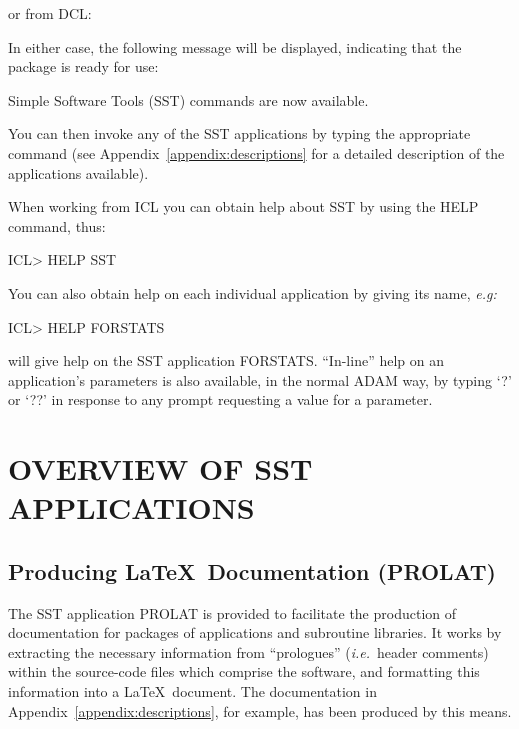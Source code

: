 \documentclass[twoside,11pt,nolof]{starlink}
\begin{document}
or from DCL:


In either case, the following message will be displayed, indicating that the
package is ready for use:

\begin{terminalv}
Simple Software Tools (SST) commands are now available.
\end{terminalv}

You can then invoke any of the SST applications by typing the appropriate
command (see Appendix~\ref{appendix:descriptions} for a detailed description
of the applications available).

When working from ICL you can obtain help about SST by using the HELP command,
thus:

\begin{terminalv}
ICL> HELP SST
\end{terminalv}

You can also obtain help on each individual application by giving its name,
\emph{e.g:}

\begin{terminalv}
ICL> HELP FORSTATS
\end{terminalv}

will give help on the SST application FORSTATS.
``In-line'' help on an application's parameters is also available, in the
normal ADAM way, by typing `?' or `??' in response to any prompt requesting a
value for a parameter.


\section{OVERVIEW OF SST APPLICATIONS}

\subsection{Producing \LaTeX\ Documentation (PROLAT)}

The SST application PROLAT is provided to facilitate the production of
documentation for packages of applications and subroutine libraries.
It works by extracting the necessary information from ``prologues'' (\emph{i.e.}\ header comments) within the source-code files which comprise the
software, and formatting this information into a \LaTeX\ document.
The documentation in Appendix~\ref{appendix:descriptions}, for example, has
been produced by this means.
\end{document}
